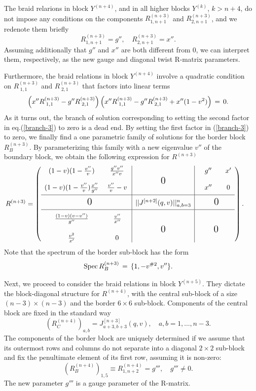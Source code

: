 \documentclass[11pt]{article}
\def\be{\begin{equation}}\def\ee{\end{equation}}
\def\ba{\begin{eqnarray}}\def\ea{\end{eqnarray}}
\begin{document}
The braid relarions in block $Y^{(n+4)}$, and in all higher blocks $Y^{(k)}$, $k> n+4$,  do not impose any conditions on the components $R^{(n+3)}_{1,n+1}$ and $R^{(n+3)}_{2,n+1}$, 
and we redenote them briefly
$$
R^{(n+3)}_{1,n+1}=g'', \quad R^{(n+3)}_{2,n+1}=x''.
$$
Assuming additionally that $g''$ and $x''$ are both different from $0$,
we can interpret them, respectively, as the new gauge and diagonal twist R-matrix parameters.

Furthermore, the braid relations in block $Y^{(n+4)}$ 
involve a quadratic condition on $R^{(n+3)}_{\;1,1}$ and $R^{(n+3)}_{\;2,1}$ that factors into linear terms
\be
\lb{branch-3}
\left(x'' R^{(n+3)}_{\;1,1}- g'' R^{(n+3)}_{\;2,1}\right)\left(x'' R^{(n+3)}_{\;1,1}-g'' R^{(n+3)}_{\;2,1}+x''(1-v^2)\right)\,=\,0.
\ee
As it turns out, the branch of solution
corresponding to setting the second factor in eq.(\ref{branch-3}) to zero is a dead end. 
By setting the first factor in (\ref{branch-3}) to zero, we finally
find a one parametric family of solutions for the border block $R_{B}^{(n+3)}$.
By parameterizing this family with a new eigenvalue $v''$ of the boundary block, we obtain the following expression for $R^{(n+3)}$
\ba
\lb{pic2}
&
R^{(n+3)}=\left(\begin{array}{cc|c|cc}
	(1-v)(1-{v''\over v})&{g'' v''\over x'' v}& & g''&x'\\[3pt]
	(1-v)(1-{v''\over v}){x''\over g''}&{v''\over v}-v&\raisebox{3mm}{\Large 0}& x''&0\\[4pt]
	\hline
\hspace{2cm}\raisebox{-2mm}{\Large 0 }	&&\raisebox{-2mm}{$||J^{[n+2]}(q,v)||_{a,b=3}^n$}&
\hspace{8mm}\raisebox{-2mm}{\Large 0 }\hspace{-2mm}&
	\\[9pt]
	\hline
	{(1-v)(v-v'')\over g''}	& \;\;\;\;{v''\over x''}^{^{\phantom{J^J}}}& &&
	\\[4pt]
	{v^2\over x'}	&0&\raisebox{4mm}{\Large 0}&\hspace{8mm}\raisebox{4mm}{\Large 0}&
\end{array}\right).
&
\ea
Note that the spectrum of the border sub-block has the form
$$
\mbox{\rm Spec\,}R_{B}^{(n+3)}\, =\,\{1,-v^{\# 2},v''\}.
$$

Next, we proceed to consider the braid relations in block $Y^{(n+5)}$. They dictate the block-diagonal structure for $R^{(n+4)}$, with the central sub-block of a size $(n-3)\times (n-3)$ and the border $6\times 6$ sub-block. Components of the central block are fixed in the standard way
$$
\left(R_{C}^{(n+4)}\right)_{a,b} = J^{[n+3]}_{a+3,b+3}(q,v), \quad a,b =1,\dots , n-3.
$$
The components of the border block are uniquely determined if we assume that its outermost rows and columns do not separate into a diagonal 
$2\times 2$ sub-block and fix the penultimate element of its first row, assuming it is non-zero:
$$
\left(R_{B}^{(n+4)}\right)_{1,5}\equiv R^{(n+4)}_{1,n+2}=g''',\quad g'''\neq 0.
$$
The new parameter $g'''$ is a gauge parameter of the R-matrix. 
\end{document}
